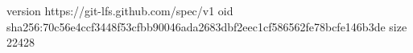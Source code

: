 version https://git-lfs.github.com/spec/v1
oid sha256:70c56e4ccf3448f53cfbb90046ada2683dbf2eec1cf586562fe78bcfe146b3de
size 22428
